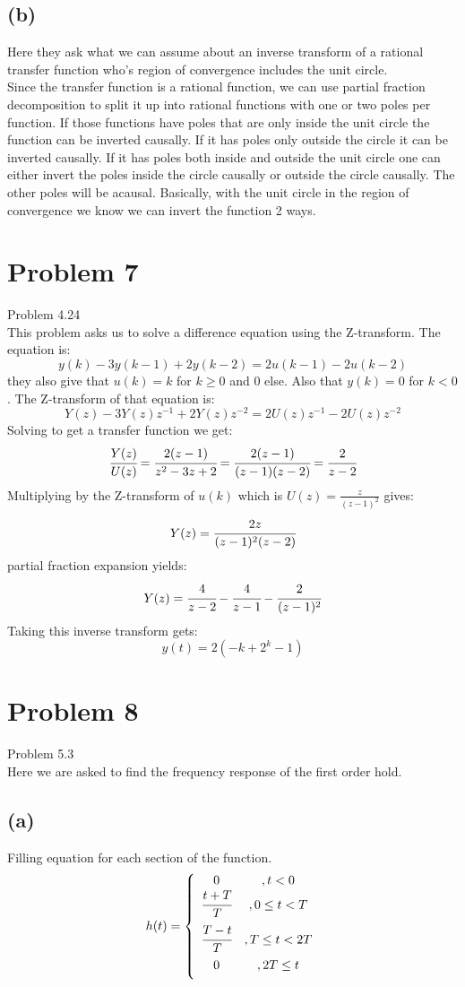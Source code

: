 \documentclass{article}
\begin{document}
\subsection*{(b)}
Here they ask what we can assume about an inverse transform of a rational transfer function who's region of convergence includes the unit circle.\\

Since the transfer function is a rational function, we can use partial fraction decomposition to split it up into rational functions with one or two poles per function. If those functions have poles that are only inside the unit circle the function can be inverted causally. If it has poles only outside the circle it can be inverted causally. If it has poles both inside and outside the unit circle one can either invert the poles inside the circle causally or outside the circle causally. The
other poles will be acausal. Basically, with the unit circle in the region of convergence we know we can invert the function 2 ways.


\section*{Problem 7}
Problem 4.24\\
This problem asks us to solve a difference equation using the Z-transform. The equation is:
\[y(k)-3y(k-1)+2y(k-2)=2u(k-1)-2u(k-2)\]
they also give that $u(k)=k$ for $k\geq 0$ and 0 else. Also that $y(k)=0$ for $k<0$. The Z-transform of that equation is:
\[Y(z)-3Y(z)z^{-1}+2Y(z)z^{-2}=2U(z)z^{-1}-2U(z)z^{-2}\]
Solving to get a transfer function we get:
\[\cfrac{Y(z)}{U(z)}=\cfrac{2(z-1)}{z^2-3z+2}=\cfrac{2(z-1)}{(z-1)(z-2)}=\cfrac{2}{z-2}\]
Multiplying by the Z-transform of $u(k)$ which is $U(z)=\frac{z}{(z-1)^2}$ gives:
\[Y(z)=\cfrac{2z}{(z-1)^2(z-2)}\]
partial fraction expansion yields:
\[Y(z)=\cfrac{4}{z-2}-\cfrac{4}{z-1}-\cfrac{2}{(z-1)^2}\]
Taking this inverse transform gets:
\[y(t)=2(-k+2^k-1)\]
\section*{Problem 8}
Problem 5.3\\
Here we are asked to find the frequency response of the first order hold.
\subsection*{(a)}
Filling equation for each section of the function.
\[h(t)=\left \{\begin{array}{cc}0&,t<0\\\vspace{0.5em}\cfrac{t+T}{T}&,0\leq t< T\\\vspace{0.5em}\cfrac{T-t}{T}&,T\leq t<2T\\\vspace{0.5em}0&,2T\leq t\end{array}\right .\]
\end{document}
